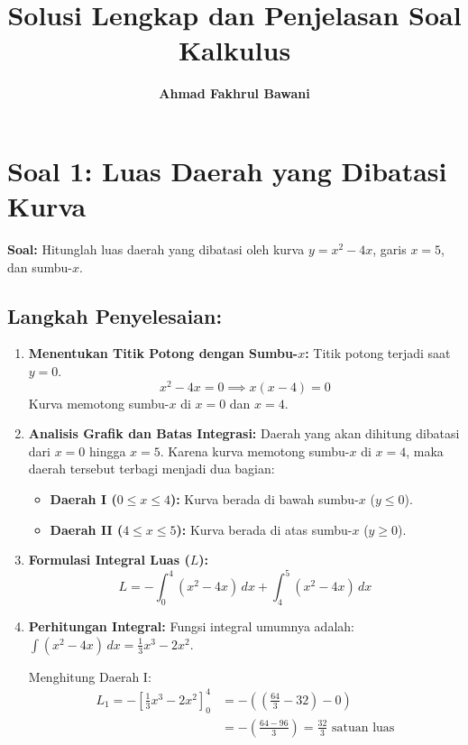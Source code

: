 \documentclass[11pt,a4paper]{article}
\title{\textbf{Solusi Lengkap dan Penjelasan Soal Kalkulus}}
\author{\textbf{Ahmad Fakhrul Bawani}}
\date{}
\begin{document}
\maketitle

\section*{Soal 1: Luas Daerah yang Dibatasi Kurva}
\textbf{Soal:} Hitunglah luas daerah yang dibatasi oleh kurva $y = x^2 - 4x$, garis $x = 5$, dan sumbu-$x$.

\subsection*{Langkah Penyelesaian:}
\begin{enumerate}
  \item \textbf{Menentukan Titik Potong dengan Sumbu-$x$:}
  Titik potong terjadi saat $y = 0$.
  \begin{equation*}
    x^2 - 4x = 0 \implies x(x - 4) = 0
  \end{equation*}
  Kurva memotong sumbu-$x$ di $x = 0$ dan $x = 4$.
  
  \item \textbf{Analisis Grafik dan Batas Integrasi:}
  Daerah yang akan dihitung dibatasi dari $x = 0$ hingga $x = 5$. Karena kurva memotong sumbu-$x$ di $x=4$, maka daerah tersebut terbagi menjadi dua bagian:
  \begin{itemize}
    \item \textbf{Daerah I ($0 \leq x \leq 4$):} Kurva berada di bawah sumbu-$x$ ($y \leq 0$).
    \item \textbf{Daerah II ($4 \leq x \leq 5$):} Kurva berada di atas sumbu-$x$ ($y \geq 0$).
  \end{itemize}
  
  \item \textbf{Formulasi Integral Luas ($L$):}
  \begin{equation*}
    L = -\int_{0}^{4} (x^2 - 4x) \, dx + \int_{4}^{5} (x^2 - 4x) \, dx
  \end{equation*}
  
  \item \textbf{Perhitungan Integral:}
  Fungsi integral umumnya adalah: $\int (x^2 - 4x) \, dx = \frac{1}{3}x^3 - 2x^2$.
  
  Menghitung Daerah I:
  \begin{align*}
    L_1 = -\left[ \frac{1}{3}x^3 - 2x^2 \right]_{0}^{4} &= -\left( \left(\frac{64}{3} - 32\right) - 0 \right) \\
    &= -\left( \frac{64 - 96}{3} \right) = \frac{32}{3} \text{ satuan luas}
  \end{align*}
  

\end{enumerate}
\end{document}
